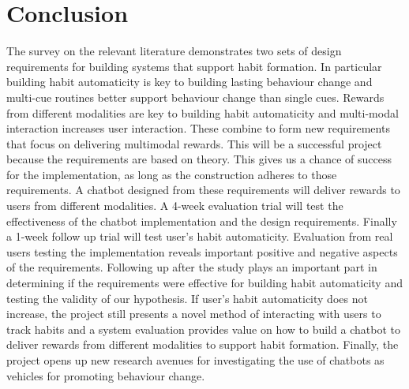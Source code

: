 
\newpage
\section{Conclusion}

The survey on the relevant literature demonstrates two sets of design requirements for building systems that support habit formation. In particular building habit automaticity is key to building lasting behaviour change and multi-cue routines better support behaviour change than single cues. Rewards from different modalities are key to building habit automaticity and multi-modal interaction increases user interaction. These combine to form new requirements that focus on delivering multimodal rewards.\newline
\newline
This will be a successful project because the requirements are based on theory. This gives us a chance of success for the implementation, as long as the construction adheres to those requirements.\newline
\newline
A chatbot designed from these requirements will deliver rewards to users from different modalities. A 4-week evaluation trial will test the effectiveness of the chatbot implementation and the design requirements. Finally a 1-week follow up trial will test user's habit automaticity.\newline
\newline
Evaluation from real users testing the implementation reveals important positive and negative aspects of the requirements. Following up after the study plays an important part in determining if the requirements were effective for building habit automaticity and testing the validity of our hypothesis. If user's habit automaticity does not increase, the project still presents a novel method of interacting with users to track habits and a system evaluation provides value on how to build a chatbot to deliver rewards from different modalities to support habit formation. Finally, the project opens up new research avenues for investigating the use of chatbots as vehicles for promoting behaviour change.
